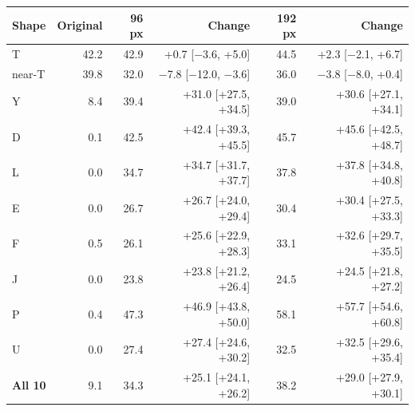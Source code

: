 
\begin{tabular}{lrrrrr}
\toprule
Shape & Original & 96 px & Change & 192 px & Change \\
\midrule
T & 42.2 & 42.9 & +0.7 [$-$3.6, +5.0] & 44.5 & +2.3 [$-$2.1, +6.7] \\
near-T & 39.8 & 32.0 & $-$7.8 [$-$12.0, $-$3.6] & 36.0 & $-$3.8 [$-$8.0, +0.4] \\
Y & 8.4 & 39.4 & +31.0 [+27.5, +34.5] & 39.0 & +30.6 [+27.1, +34.1] \\
D & 0.1 & 42.5 & +42.4 [+39.3, +45.5] & 45.7 & +45.6 [+42.5, +48.7] \\
L & 0.0 & 34.7 & +34.7 [+31.7, +37.7] & 37.8 & +37.8 [+34.8, +40.8] \\
E & 0.0 & 26.7 & +26.7 [+24.0, +29.4] & 30.4 & +30.4 [+27.5, +33.3] \\
F & 0.5 & 26.1 & +25.6 [+22.9, +28.3] & 33.1 & +32.6 [+29.7, +35.5] \\
J & 0.0 & 23.8 & +23.8 [+21.2, +26.4] & 24.5 & +24.5 [+21.8, +27.2] \\
P & 0.4 & 47.3 & +46.9 [+43.8, +50.0] & 58.1 & +57.7 [+54.6, +60.8] \\
U & 0.0 & 27.4 & +27.4 [+24.6, +30.2] & 32.5 & +32.5 [+29.6, +35.4] \\
\midrule
\textbf{All 10} & 9.1 & 34.3 & +25.1 [+24.1, +26.2] & 38.2 & +29.0 [+27.9, +30.1] \\
\bottomrule
\end{tabular}
